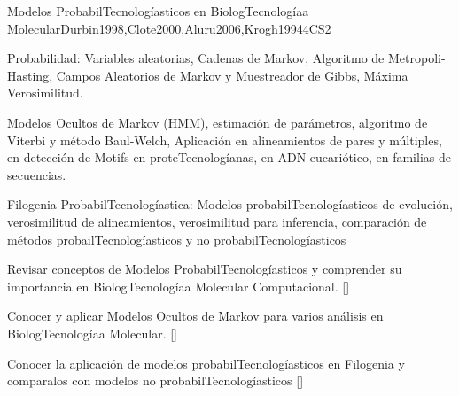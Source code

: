 \begin{syllabus}
\begin{unit}{Modelos ProbabilTecnologíasticos en BiologTecnologíaa Molecular}{}{Durbin1998,Clote2000,Aluru2006,Krogh1994}{4}{CS2}
   \begin{topics}
    \item Probabilidad: Variables aleatorias, Cadenas de Markov, Algoritmo de Metropoli-Hasting, Campos Aleatorios de Markov y Muestreador de Gibbs, Máxima Verosimilitud.
    \item Modelos Ocultos de Markov (HMM), estimación de parámetros, algoritmo de Viterbi y método Baul-Welch, Aplicación en alineamientos de pares y múltiples, en detección de Motifs en proteTecnologíanas, en ADN eucariótico, en familias de secuencias.
		\item Filogenia ProbabilTecnologíastica: Modelos probabilTecnologíasticos de evolución, verosimilitud de alineamientos, verosimilitud para inferencia, comparación de métodos probailTecnologíasticos y no probabilTecnologíasticos
   \end{topics}
   \begin{learningoutcomes}
      \item  Revisar conceptos de Modelos ProbabilTecnologíasticos y comprender su importancia en BiologTecnologíaa Molecular Computacional. [\Assessment]
	  \item Conocer y aplicar Modelos Ocultos de Markov para varios análisis en BiologTecnologíaa Molecular. [\Usage]
		\item Conocer la aplicación de modelos probabilTecnologíasticos en Filogenia y comparalos con modelos no probabilTecnologíasticos [\Assessment]
   \end{learningoutcomes}
\end{unit}

\begin{coursebibliography}
\end{coursebibliography}

\end{syllabus}
